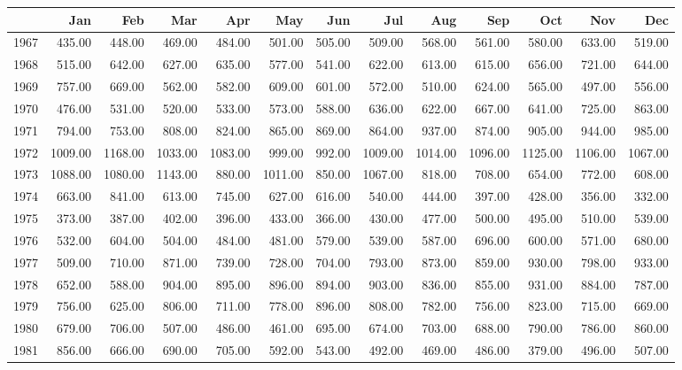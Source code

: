 \begin{longtable}{rrrrrrrrrrrrr}
  \hline
 & Jan & Feb & Mar & Apr & May & Jun & Jul & Aug & Sep & Oct & Nov & Dec \\ 
  \hline
1967 & 435.00 & 448.00 & 469.00 & 484.00 & 501.00 & 505.00 & 509.00 & 568.00 & 561.00 & 580.00 & 633.00 & 519.00 \\ 
  1968 & 515.00 & 642.00 & 627.00 & 635.00 & 577.00 & 541.00 & 622.00 & 613.00 & 615.00 & 656.00 & 721.00 & 644.00 \\ 
  1969 & 757.00 & 669.00 & 562.00 & 582.00 & 609.00 & 601.00 & 572.00 & 510.00 & 624.00 & 565.00 & 497.00 & 556.00 \\ 
  1970 & 476.00 & 531.00 & 520.00 & 533.00 & 573.00 & 588.00 & 636.00 & 622.00 & 667.00 & 641.00 & 725.00 & 863.00 \\ 
  1971 & 794.00 & 753.00 & 808.00 & 824.00 & 865.00 & 869.00 & 864.00 & 937.00 & 874.00 & 905.00 & 944.00 & 985.00 \\ 
  1972 & 1009.00 & 1168.00 & 1033.00 & 1083.00 & 999.00 & 992.00 & 1009.00 & 1014.00 & 1096.00 & 1125.00 & 1106.00 & 1067.00 \\ 
  1973 & 1088.00 & 1080.00 & 1143.00 & 880.00 & 1011.00 & 850.00 & 1067.00 & 818.00 & 708.00 & 654.00 & 772.00 & 608.00 \\ 
  1974 & 663.00 & 841.00 & 613.00 & 745.00 & 627.00 & 616.00 & 540.00 & 444.00 & 397.00 & 428.00 & 356.00 & 332.00 \\ 
  1975 & 373.00 & 387.00 & 402.00 & 396.00 & 433.00 & 366.00 & 430.00 & 477.00 & 500.00 & 495.00 & 510.00 & 539.00 \\ 
  1976 & 532.00 & 604.00 & 504.00 & 484.00 & 481.00 & 579.00 & 539.00 & 587.00 & 696.00 & 600.00 & 571.00 & 680.00 \\ 
  1977 & 509.00 & 710.00 & 871.00 & 739.00 & 728.00 & 704.00 & 793.00 & 873.00 & 859.00 & 930.00 & 798.00 & 933.00 \\ 
  1978 & 652.00 & 588.00 & 904.00 & 895.00 & 896.00 & 894.00 & 903.00 & 836.00 & 855.00 & 931.00 & 884.00 & 787.00 \\ 
  1979 & 756.00 & 625.00 & 806.00 & 711.00 & 778.00 & 896.00 & 808.00 & 782.00 & 756.00 & 823.00 & 715.00 & 669.00 \\ 
  1980 & 679.00 & 706.00 & 507.00 & 486.00 & 461.00 & 695.00 & 674.00 & 703.00 & 688.00 & 790.00 & 786.00 & 860.00 \\ 
  1981 & 856.00 & 666.00 & 690.00 & 705.00 & 592.00 & 543.00 & 492.00 & 469.00 & 486.00 & 379.00 & 496.00 & 507.00 \\ 

\end{longtable}
